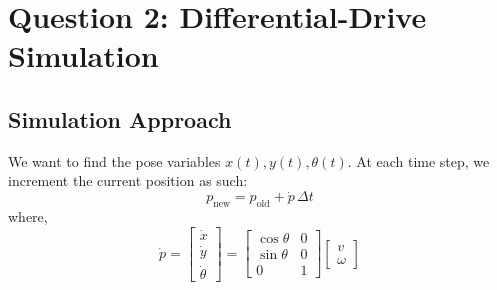 \section{Question 2: Differential-Drive Simulation}

\subsection*{Simulation Approach}
We want to find the pose variables $x(t), y(t), \theta(t)$. At each time step, we increment the current position as such:
\begin{equation}
    p_{\text{new}} = p_{\text{old}} + \dot{p}\,\Delta t
\end{equation}
where,
\begin{equation}
    \dot{p} = \begin{bmatrix} \dot{x} \\ \dot{y} \\ \dot{\theta} \end{bmatrix} = \begin{bmatrix} \cos\theta & 0 \\ \sin\theta & 0 \\ 0 & 1 \end{bmatrix} \begin{bmatrix} v \\ \omega \end{bmatrix}
\end{equation}

